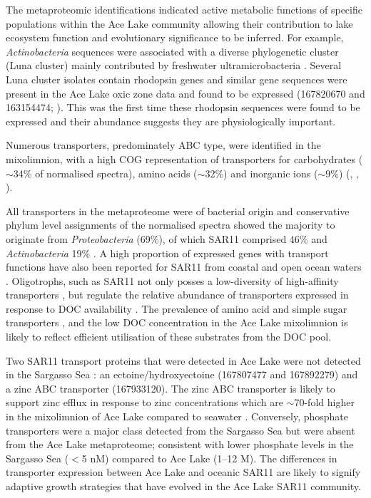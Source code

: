 The metaproteomic identifications  indicated active metabolic functions of specific populations within the Ace Lake community allowing their contribution to lake ecosystem function and evolutionary significance to be inferred.
For example, \emph{Actinobacteria} sequences were associated with a diverse phylogenetic cluster (Luna cluster) mainly contributed by freshwater ultramicrobacteria \cite{Hahn2003}. 
Several Luna cluster isolates contain rhodopsin genes \cite{Sharma2009} and similar gene sequences were present in the Ace Lake oxic zone data and found to be expressed (167820670 and 163154474; ).
This was the first time these rhodopsin sequences were found to be expressed and their abundance suggests they are physiologically important.

Numerous transporters, predominately \ac{ABC} type, were identified in the mixolimnion, with a high \ac{COG} representation of transporters for carbohydrates ($\sim$34\% of normalised spectra), amino acids ($\sim$32\%) and inorganic ions ($\sim$9\%) (, ,  ).

All transporters in the metaproteome were of bacterial origin and conservative phylum level assignments of the normalised spectra showed the majority to originate from \emph{Proteobacteria} (69\%), of which SAR11 comprised 46\% and \emph{Actinobacteria} 19\% . 
A high proportion of expressed genes with transport functions have also been reported for SAR11 from coastal \cite{Poretsky2010} and open ocean waters \cite{Sowell2009, Morris2010}. 
Oligotrophs, such as SAR11 not only posses a low-diversity of high-affinity transporters \cite{Lauro2009}, but regulate the relative abundance of transporters expressed in response to \ac{DOC} availability \cite{Poretsky2010}. 
The prevalence of amino acid and simple sugar transporters , and the low \ac{DOC} concentration in the Ace Lake mixolimnion \cite{Rankin1999} is likely to reflect efficient utilisation of these substrates from the \ac{DOC} pool. 

Two SAR11 transport proteins that were detected in Ace Lake  were not detected in the Sargasso Sea \cite{Sowell2009}: an ectoine/hydroxyectoine (167807477 and 167892279) and a zinc \ac{ABC} transporter (167933120). 
The zinc \ac{ABC} transporter is likely to support zinc efflux in response to zinc concentrations which are $\sim$70-fold higher in the mixolimnion of Ace Lake compared to seawater \cite{Rankin1999}. 
Conversely, phosphate transporters were a major class detected from the Sargasso Sea \cite{Sowell2009} but were absent from the Ace Lake metaproteome; consistent with lower phosphate levels in the Sargasso Sea ($<$5 nM) compared to Ace Lake (1--12 \textmu{}M). 
The differences in transporter expression between Ace Lake and oceanic SAR11 are likely to signify adaptive growth strategies that have evolved in the Ace Lake SAR11 community.


